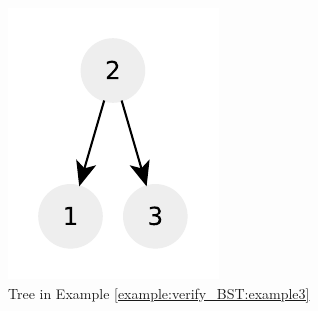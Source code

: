 \begin{figure}
\begin{subfigure}[t]{0.30\textwidth}
		\includegraphics[width=1\linewidth]{sources/verify_BST/images/example3}
		\caption[]{Tree in Example \ref{example:verify_BST:example3}}
		\label{fig:verify:example3}
	 \end{subfigure}
	 \hfill
	 \begin{subfigure}[t]{0.30\textwidth}

\end{subfigure}
\end{figure}
